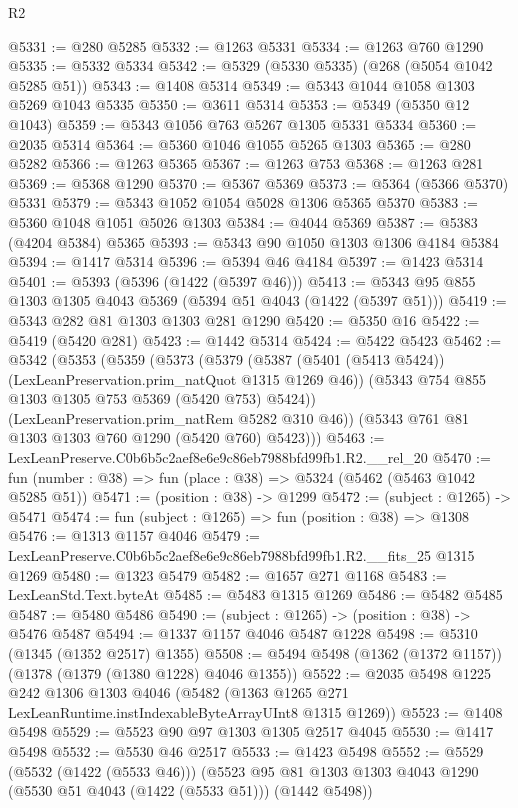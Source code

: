 \begin{lexlean}{R2}
\begin{coremodule}
@5331 := @280 @5285
@5332 := @1263 @5331
@5334 := @1263 @760 @1290
@5335 := @5332 @5334
@5342 := @5329 (@5330 @5335) (@268 (@5054 @1042 @5285 @51))
@5343 := @1408 @5314
@5349 := @5343 @1044 @1058 @1303 @5269 @1043 @5335
@5350 := @3611 @5314
@5353 := @5349 (@5350 @12 @1043)
@5359 := @5343 @1056 @763 @5267 @1305 @5331 @5334
@5360 := @2035 @5314
@5364 := @5360 @1046 @1055 @5265 @1303
@5365 := @280 @5282
@5366 := @1263 @5365
@5367 := @1263 @753
@5368 := @1263 @281
@5369 := @5368 @1290
@5370 := @5367 @5369
@5373 := @5364 (@5366 @5370) @5331
@5379 := @5343 @1052 @1054 @5028 @1306 @5365 @5370
@5383 := @5360 @1048 @1051 @5026 @1303
@5384 := @4044 @5369
@5387 := @5383 (@4204 @5384) @5365
@5393 := @5343 @90 @1050 @1303 @1306 @4184 @5384
@5394 := @1417 @5314
@5396 := @5394 @46 @4184
@5397 := @1423 @5314
@5401 := @5393 (@5396 (@1422 (@5397 @46)))
@5413 := @5343 @95 @855 @1303 @1305 @4043 @5369 (@5394 @51 @4043 (@1422 (@5397 @51)))
@5419 := @5343 @282 @81 @1303 @1303 @281 @1290
@5420 := @5350 @16
@5422 := @5419 (@5420 @281)
@5423 := @1442 @5314
@5424 := @5422 @5423
@5462 := @5342
    (@5353
      (@5359
        (@5373
          (@5379
            (@5387 (@5401 (@5413 @5424)) (LexLeanPreservation.prim_natQuot @1315 @1269 @46))
            (@5343 @754 @855 @1303 @1305 @753 @5369 (@5420 @753) @5424))
          (LexLeanPreservation.prim_natRem @5282 @310 @46))
        (@5343 @761 @81 @1303 @1303 @760 @1290 (@5420 @760) @5423)))
@5463 := LexLeanPreserve.C0b6b5c2aef8e6e9c86eb7988bfd99fb1.R2.__rel_20
@5470 := fun (number : @38) => fun (place : @38) => @5324 (@5462 (@5463 @1042 @5285 @51))
@5471 := (position : @38) -> @1299
@5472 := (subject : @1265) -> @5471
@5474 := fun (subject : @1265) => fun (position : @38) => @1308
@5476 := @1313 @1157 @4046
@5479 := LexLeanPreserve.C0b6b5c2aef8e6e9c86eb7988bfd99fb1.R2.__fits_25 @1315 @1269
@5480 := @1323 @5479
@5482 := @1657 @271 @1168
@5483 := LexLeanStd.Text.byteAt
@5485 := @5483 @1315 @1269
@5486 := @5482 @5485
@5487 := @5480 @5486
@5490 := (subject : @1265) -> (position : @38) -> @5476 @5487
@5494 := @1337 @1157 @4046 @5487 @1228
@5498 := @5310 (@1345 (@1352 @2517) @1355)
@5508 := @5494 @5498 (@1362 (@1372 @1157)) (@1378 (@1379 (@1380 @1228) @4046 @1355))
@5522 := @2035
    @5498
    @1225
    @242
    @1306
    @1303
    @4046
    (@5482 (@1363 @1265 @271 LexLeanRuntime.instIndexableByteArrayUInt8 @1315 @1269))
@5523 := @1408 @5498
@5529 := @5523 @90 @97 @1303 @1305 @2517 @4045
@5530 := @1417 @5498
@5532 := @5530 @46 @2517
@5533 := @1423 @5498
@5552 := @5529
    (@5532 (@1422 (@5533 @46)))
    (@5523 @95 @81 @1303 @1303 @4043 @1290 (@5530 @51 @4043 (@1422 (@5533 @51))) (@1442 @5498))

\end{coremodule}
\end{lexlean}
